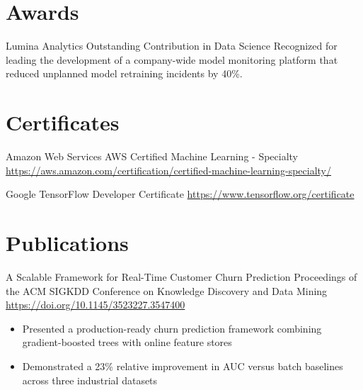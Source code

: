 \documentclass[a4paper, serif, 10pt]{moderncv}
\begin{document}
\section{Awards}

        {Lumina Analytics}
        {Outstanding Contribution in Data Science}
        {}
        {}
        {Recognized for leading the development of a company-wide model monitoring platform that reduced unplanned model retraining incidents by 40\%.}
\section{Certificates}

        {Amazon Web Services}
        {AWS Certified Machine Learning - Specialty}
        {\url{https://aws.amazon.com/certification/certified-machine-learning-specialty/}}
        {}
        {}

        {Google}
        {TensorFlow Developer Certificate}
        {\url{https://www.tensorflow.org/certificate}}
        {}
        {}
\section{Publications}

        {A Scalable Framework for Real-Time Customer Churn Prediction}
        {Proceedings of the ACM SIGKDD Conference on Knowledge Discovery and Data Mining}
        {\url{https://doi.org/10.1145/3523227.3547400}}
        {}
        {\begin{itemize}
\item Presented a production-ready churn prediction framework combining gradient-boosted trees with online feature stores
\item Demonstrated a 23\% relative improvement in AUC versus batch baselines across three industrial datasets
\end{itemize}}
\end{document}

